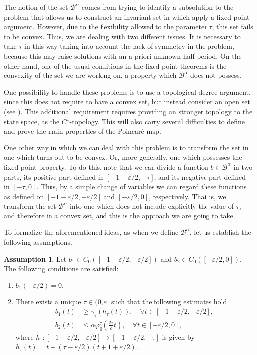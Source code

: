 \documentclass[a4paper,11pt]{article}
\theoremstyle{plain}
\theoremstyle{definition}
\newtheorem{assumption}{Assumption}[section]
\theoremstyle{definition}
\newcommand{\B}{\mathcal{B}}
\numberwithin{equation}{section}
\begin{document}
The notion of the set $\B^\alpha$ comes from trying to identify a subsolution to the problem that allows us to construct an invariant set in which apply a fixed point argument. However, due to the flexibility allowed to the parameter $\tau$, this set fails to be convex. Thus, we are dealing with two different issues. It is necessary to take $\tau$ in this way taking into account the lack of symmetry in the problem, because this may raise solutions with an a priori unknown half-period. On the other hand, one of the usual conditions in the fixed point theorems is the convexity of the set we are working on, a property which $\B^\alpha$ does not possess.

One possibility to handle these problems is to use a topological degree argument, since this does not require to have a convex set, but instead consider an open set (see \cite{zeidler}). This additional requirement requires providing an stronger topology to the state space, as the $C^1$-topology. This will also carry several difficulties to define and prove the main properties of the Poincaré map.

One other way in which we can deal with this problem is to transform the set in one which turns out to be convex. Or, more generally, one which possesses the fixed point property. To do this, note that we can divide a function $b\in \B^\alpha$ in two parts, its positive part defined in $[-1-\varepsilon/2,-\tau]$, and its negative part defined in $[-\tau,0]$. Thus, by a simple change of variables we can regard these functions as defined on $[-1-\varepsilon/2,-\varepsilon/2]$ and $[-\varepsilon/2,0]$, respectively. That is, we transform the set $\B^\alpha$ into one which does not include explicitly the value of $\tau$, and therefore in a convex set, and this is the approach we are going to take.

To formalize the aforementioned ideas, as when we define $\B^\alpha$, let us establish the following assumptions.
\begin{assumption}\label{as:Ualpha}
Let $b_1\in C_0([-1-\varepsilon/2,-\varepsilon/2])$ and $b_2 \in C_0([-\varepsilon/2,0])$. The following conditions are satisfied:
\begin{enumerate}[label={\roman*)}]
    \item $b_1(-\varepsilon/2)=0$.
    \item There exists a unique $\tau\in(0,\varepsilon]$ such that the following estimates hold
\begin{align*}
    b_1(t) &\geq \gamma_\tau(h_\tau(t)), \quad \forall t\in[-1-\varepsilon/2,-\varepsilon/2], \\
    b_2(t) &\leq \alpha \varphi_0^\tau \left( \frac{2\tau}{\varepsilon}t \right), \quad \forall t\in[-\varepsilon/2,0],
\end{align*}
where $h_\tau \colon [-1-\varepsilon/2, -\varepsilon/2]\to [-1-\varepsilon/2,-\tau]$ is given by $h_\tau(t)=t-(\tau-\varepsilon/2)(t+1+\varepsilon/2)$.
\end{enumerate}
\end{assumption}
\end{document}
